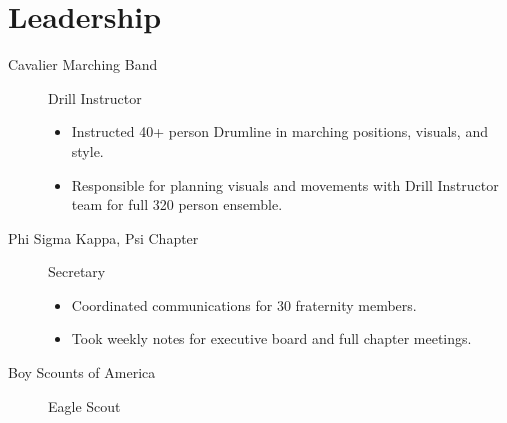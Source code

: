 \documentclass{mycv}
\begin{document}
\section{Leadership}
\vspace{-\parskip}%
\begin{description}
  \item[Cavalier Marching Band] Drill Instructor
  \begin{itemize}
    \item Instructed 40+ person Drumline in marching positions, visuals, and style.
    \item Responsible for planning visuals and movements with Drill Instructor team for full 320 person ensemble.
  \end{itemize} 
  \item[Phi Sigma Kappa, Psi Chapter] Secretary
  \begin{itemize}
    \item Coordinated communications for 30 fraternity members.
    \item Took weekly notes for executive board and full chapter meetings.
  \end{itemize} 
  \item[Boy Scounts of America] Eagle Scout
\end{description}
\end{document}
